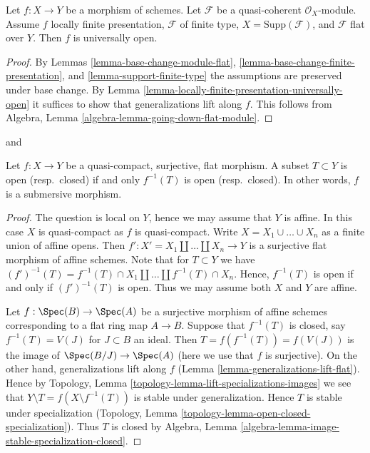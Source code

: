 \begin{lemma}
\label{lemma-pf-flat-module-open}
Let $f : X \to Y$ be a morphism of schemes.
Let $\mathcal{F}$ be a quasi-coherent $\mathcal{O}_X$-module.
Assume $f$ locally finite presentation, $\mathcal{F}$ of
finite type, $X = \text{Supp}(\mathcal{F})$, and
$\mathcal{F}$ flat over $Y$. Then $f$ is universally open.
\end{lemma}

\begin{proof}
By Lemmas \ref{lemma-base-change-module-flat},
\ref{lemma-base-change-finite-presentation}, and
\ref{lemma-support-finite-type}
the assumptions are preserved under base change.
By Lemma \ref{lemma-locally-finite-presentation-universally-open}
it suffices to show that generalizations lift along $f$.
This follows from Algebra, Lemma \ref{algebra-lemma-going-down-flat-module}.
\end{proof}

\begin{lemma}
\label{lemma-fpqc-quotient-topology}
\begin{reference}
\cite[Expose VIII, Corollaire 4.3]{SGA1} and
\cite[IV, Corollaire 2.3.12]{EGA}
\end{reference}
Let $f : X \to Y$ be a quasi-compact, surjective, flat morphism.
A subset $T \subset Y$ is open (resp.\ closed) if and only
$f^{-1}(T)$ is open (resp.\ closed). In other words, $f$ is
a submersive morphism.
\end{lemma}

\begin{proof}
The question is local on $Y$, hence we may assume that $Y$ is affine.
In this case $X$ is quasi-compact as $f$ is quasi-compact.
Write $X = X_1 \cup \ldots \cup X_n$ as a finite union of affine opens.
Then $f' : X' = X_1 \amalg \ldots \amalg X_n \to Y$ is a surjective
flat morphism of affine schemes. Note that for $T \subset Y$ we have
$(f')^{-1}(T) = f^{-1}(T) \cap X_1 \amalg \ldots \amalg f^{-1}(T) \cap X_n$.
Hence, $f^{-1}(T)$ is open if and only if $(f')^{-1}(T)$ is open.
Thus we may assume both $X$ and $Y$ are affine.

\medskip\noindent
Let $f : \Spec(B) \to \Spec(A)$ be a surjective morphism of affine schemes
corresponding to a flat ring map $A \to B$. Suppose that $f^{-1}(T)$ is
closed, say $f^{-1}(T) = V(J)$ for $J \subset B$ an ideal. Then
$T = f(f^{-1}(T)) = f(V(J))$ is the image of $\Spec(B/J) \to \Spec(A)$
(here we use that $f$ is surjective). On the other hand, generalizations
lift along $f$ (Lemma \ref{lemma-generalizations-lift-flat}).
Hence by Topology, Lemma \ref{topology-lemma-lift-specializations-images}
we see that $Y \setminus T = f(X \setminus f^{-1}(T))$ is stable under
generalization. Hence $T$ is stable under specialization
(Topology, Lemma \ref{topology-lemma-open-closed-specialization}).
Thus $T$ is closed by
Algebra, Lemma \ref{algebra-lemma-image-stable-specialization-closed}.
\end{proof}

